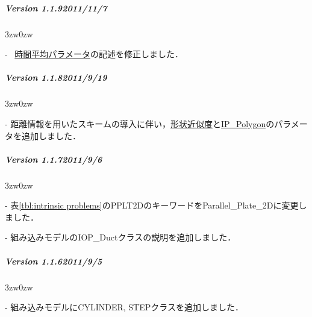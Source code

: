 { \small

%
\subparagraph{Version 1.1.9\hspace{1cm}2011/11/7}

\begin{description}
\begin{indentation}{3zw}{0zw}
\item[-] {}~\hyperlink{tgt:average_option}{時間平均パラメータ}の記述を修正しました．
\end{indentation}
\end{description}

\vspace{3mm}

%
\subparagraph{Version 1.1.8\hspace{1cm}2011/9/19}

\begin{description}
\begin{indentation}{3zw}{0zw}
\item[-] 距離情報を用いたスキームの導入に伴い，\hyperlink{tgt:solver_property}{形状近似度}と\hyperlink{tgt:intrinsic model}{IP\_Polygon}のパラメータを追加しました．
\end{indentation}
\end{description}

\vspace{3mm}

%
\subparagraph{Version 1.1.7\hspace{1cm}2011/9/6}

\begin{description}
\begin{indentation}{3zw}{0zw}
\item[-] 表\ref{tbl:intrinsic problems}のPPLT2DのキーワードをParallel\_Plate\_2Dに変更しました．
\item[-] 組み込みモデルのIOP\_Ductクラスの説明を追加しました．
\end{indentation}
\end{description}

\vspace{3mm}

%
\subparagraph{Version 1.1.6\hspace{1cm}2011/9/5}

\begin{description}
\begin{indentation}{3zw}{0zw}
\item[-] 組み込みモデルにCYLINDER, STEPクラスを追加しました．
\end{indentation}
\end{description}

}

